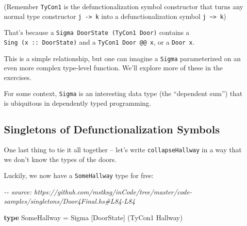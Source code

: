 \documentclass[]{article}
\newenvironment{Shaded}{}{}
\newcommand{\CommentTok}[1]{\textcolor[rgb]{0.38,0.63,0.69}{\textit{#1}}}
\newcommand{\DataTypeTok}[1]{\textcolor[rgb]{0.56,0.13,0.00}{#1}}
\newcommand{\KeywordTok}[1]{\textcolor[rgb]{0.00,0.44,0.13}{\textbf{#1}}}
\newcommand{\NormalTok}[1]{#1}
\newcommand{\OperatorTok}[1]{\textcolor[rgb]{0.40,0.40,0.40}{#1}}
\newcommand{\OtherTok}[1]{\textcolor[rgb]{0.00,0.44,0.13}{#1}}
\begin{document}
\begin{Shaded}
\end{Shaded}

(Remember \texttt{TyCon1} is the defunctionalization symbol constructor that
turns any normal type constructor \texttt{j\ -\textgreater{}\ k} into a
defunctionalization symbol \texttt{j\ \textasciitilde{}\textgreater{}\ k})

That's because a \texttt{Sigma\ DoorState\ (TyCon1\ Door)} contains a
\texttt{Sing\ (x\ ::\ DoorState)} and a \texttt{TyCon1\ Door\ @@\ x}, or a
\texttt{Door\ x}.

This is a simple relationship, but one can imagine a \texttt{Sigma}
parameterized on an even more complex type-level function. We'll explore more of
these in the exercises.

For some context, \texttt{Sigma} is an interesting data type (the ``dependent
sum'') that is ubiquitous in dependently typed programming.

\subsection{Singletons of Defunctionalization
Symbols}\label{singletons-of-defunctionalization-symbols}

One last thing to tie it all together -- let's write \texttt{collapseHallway} in
a way that we don't know the types of the doors.

Luckily, we now have a \texttt{SomeHallway} type for free:

\begin{Shaded}
\begin{Highlighting}[]
\CommentTok{{-}{-} source: https://github.com/mstksg/inCode/tree/master/code{-}samples/singletons/Door4Final.hs\#L84{-}L84}

\KeywordTok{type} \DataTypeTok{SomeHallway} \OtherTok{=} \DataTypeTok{Sigma}\NormalTok{ [}\DataTypeTok{DoorState}\NormalTok{] (}\DataTypeTok{TyCon1} \DataTypeTok{Hallway}\NormalTok{)}
\end{Highlighting}
\end{Shaded}
\end{document}

